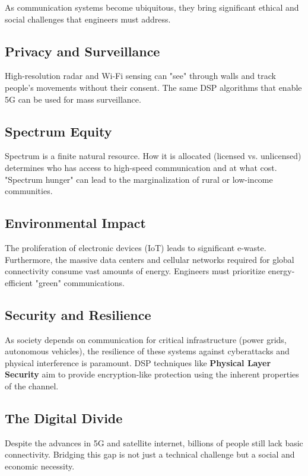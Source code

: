 
As communication systems become ubiquitous, they bring significant ethical and social challenges that engineers must address.

\subsection{Privacy and Surveillance}
High-resolution radar and Wi-Fi sensing can "see" through walls and track people's movements without their consent. The same DSP algorithms that enable 5G can be used for mass surveillance.

\subsection{Spectrum Equity}
Spectrum is a finite natural resource. How it is allocated (licensed vs. unlicensed) determines who has access to high-speed communication and at what cost. "Spectrum hunger" can lead to the marginalization of rural or low-income communities.

\subsection{Environmental Impact}
The proliferation of electronic devices (IoT) leads to significant e-waste. Furthermore, the massive data centers and cellular networks required for global connectivity consume vast amounts of energy. Engineers must prioritize energy-efficient "green" communications.

\subsection{Security and Resilience}
As society depends on communication for critical infrastructure (power grids, autonomous vehicles), the resilience of these systems against cyberattacks and physical interference is paramount. DSP techniques like \textbf{Physical Layer Security} aim to provide encryption-like protection using the inherent properties of the channel.

\subsection{The Digital Divide}
Despite the advances in 5G and satellite internet, billions of people still lack basic connectivity. Bridging this gap is not just a technical challenge but a social and economic necessity.

